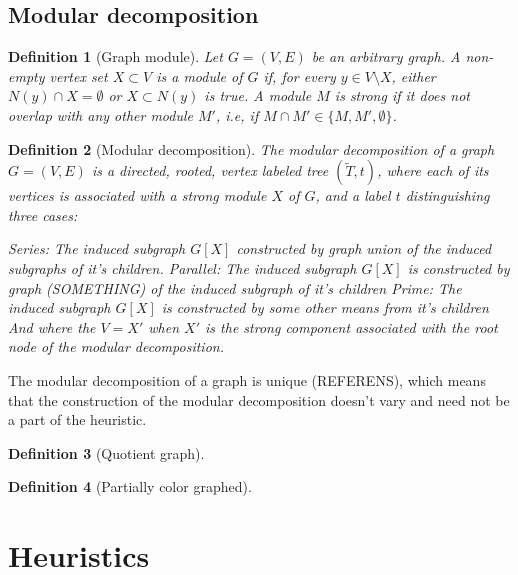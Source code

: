 \documentclass{amsart}
\newtheorem{definition}{Definition}
\begin{document}
\subsection{Modular decomposition}

\begin{definition}[Graph module]
    Let $G = (V,E)$ be an arbitrary graph. A non-empty vertex set $X \subset V$
    is a \textit{module} of $G$ if, for every $y \in V \setminus X$,  either
    $N(y) \cap X = \emptyset$ or $X \subset N(y)$ is true. A module $M$ is
    \textit{strong} if it does not overlap with any other module $M'$, i.e, if 
    $M \cap M' \in \{M,M',\emptyset \}$.
\end{definition}
   

\begin{definition}[Modular decomposition]
    The modular decomposition of a graph $G = (V,E)$ is a directed, rooted, vertex labeled tree
    $(\widetilde{T},t)$, where each of its vertices is associated with a strong
    module $X$ of $G$, and a label $t$ distinguishing  three cases:

    Series: The induced subgraph $G[X]$ constructed by graph union of the
    induced subgraphs of it's children.
    Parallel: The induced subgraph $G[X]$ is constructed by graph (SOMETHING) of
    the induced subgraph of it's children
    Prime: The induced subgraph $G[X]$ is constructed by some other means from
    it's children
    And where the $V = X'$ when $X'$ is the strong component associated with the
    root node of the modular decomposition.
\end{definition}

The modular decomposition of a graph is unique (REFERENS), which means that the
construction of the modular decomposition doesn't vary and need not be a part of
the heuristic.

\begin{definition}[Quotient graph]

\end{definition}

\begin{definition}[Partially color graphed]


\end{definition}

\section{Heuristics}
\end{document}
